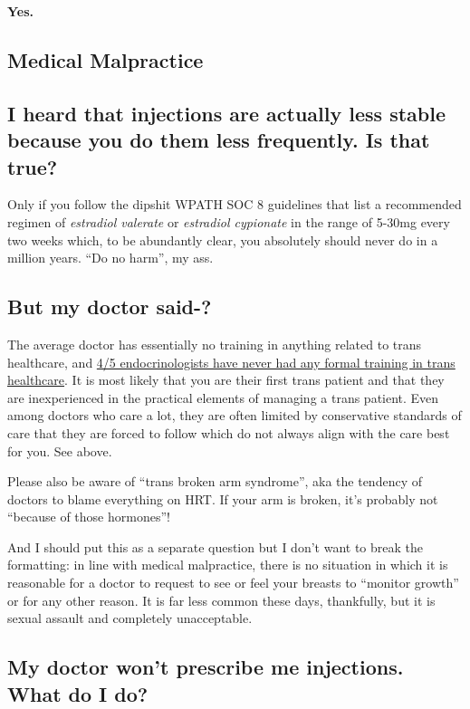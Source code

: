 \documentclass{article}
\begin{document}
\textbf{Yes.}

\subsection*{Medical Malpractice}

\subsection{I heard that injections are actually less stable because you do them less frequently. Is that true?}

Only if you follow the dipshit WPATH SOC 8 guidelines that list a recommended regimen of \textit{estradiol valerate} or \textit{estradiol cypionate} in the range of 5-30mg every two weeks which, to be abundantly clear, you absolutely should never do in a million years. “Do no harm”, my ass. 

\subsection{But my doctor said-?}

The average doctor has essentially no training in anything related to trans healthcare, and \href{https://www.endocrine.org/news-and-advocacy/news-room/2017/endocrinologists-want-training-in-transgender-care }{4/5 endocrinologists have never had any formal training in trans healthcare}. It is most likely that you are their first trans patient and that they are inexperienced in the practical elements of managing a trans patient. Even among doctors who care a lot, they are often limited by conservative standards of care that they are forced to follow which do not always align with the care best for you. See above.

Please also be aware of “trans broken arm syndrome”, aka the tendency of doctors to blame everything on HRT. If your arm is broken, it's probably not “because of those hormones”!

And I should put this as a separate question but I don't want to break the formatting: in line with medical malpractice, there is no situation in which it is reasonable for a doctor to request to see or feel your breasts to “monitor growth” or for any other reason. It is far less common these days, thankfully, but it is sexual assault and completely unacceptable.

\subsection{My doctor won’t prescribe me injections. What do I do?}
\end{document}
